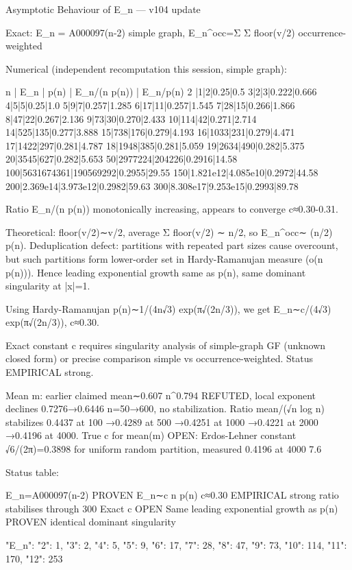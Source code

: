 Asymptotic Behaviour of E_n — v104 update

Exact: E_n = A000097(n-2) simple graph, E_n^{occ}=Σ Σ floor(v/2) occurrence-weighted

Numerical (independent recomputation this session, simple graph):

n | E_n | p(n) | E_n/(n p(n)) | E_n/p(n)
2 |1|2|0.25|0.5
3|2|3|0.222|0.666
4|5|5|0.25|1.0
5|9|7|0.257|1.285
6|17|11|0.257|1.545
7|28|15|0.266|1.866
8|47|22|0.267|2.136
9|73|30|0.270|2.433
10|114|42|0.271|2.714
14|525|135|0.277|3.888
15|738|176|0.279|4.193
16|1033|231|0.279|4.471
17|1422|297|0.281|4.787
18|1948|385|0.281|5.059
19|2634|490|0.282|5.375
20|3545|627|0.282|5.653
50|2977224|204226|0.2916|14.58
100|5631674361|190569292|0.2955|29.55
150|1.821e12|4.085e10|0.2972|44.58
200|2.369e14|3.973e12|0.2982|59.63
300|8.308e17|9.253e15|0.2993|89.78

Ratio E_n/(n p(n)) monotonically increasing, appears to converge c≈0.30-0.31.

Theoretical: floor(v/2)∼v/2, average Σ floor(v/2) ∼ n/2, so E_n^{occ}∼ (n/2) p(n). Deduplication defect: partitions with repeated part sizes cause overcount, but such partitions form lower-order set in Hardy-Ramanujan measure (o(n p(n))). Hence leading exponential growth same as p(n), same dominant singularity at |x|=1.

Using Hardy-Ramanujan p(n)∼1/(4n√3) exp(π√(2n/3)), we get E_n∼c/(4√3) exp(π√(2n/3)), c≈0.30.

Exact constant c requires singularity analysis of simple-graph GF (unknown closed form) or precise comparison simple vs occurrence-weighted. Status EMPIRICAL strong.

Mean m: earlier claimed mean∼0.607 n^{0.794} REFUTED, local exponent declines 0.7276→0.6446 n=50→600, no stabilization. Ratio mean/(√n log n) stabilizes 0.4437 at 100 →0.4289 at 500 →0.4251 at 1000 →0.4221 at 2000 →0.4196 at 4000. True c for mean(m) OPEN: Erdos-Lehner constant √6/(2π)=0.3898 for uniform random partition, measured 0.4196 at 4000 7.6%

Status table:

E_n=A000097(n-2) PROVEN
E_n∼c n p(n) c≈0.30 EMPIRICAL strong ratio stabilises through 300
Exact c OPEN
Same leading exponential growth as p(n) PROVEN identical dominant singularity

{
  "E_n": {
    "2": 1,
    "3": 2,
    "4": 5,
    "5": 9,
    "6": 17,
    "7": 28,
    "8": 47,
    "9": 73,
    "10": 114,
    "11": 170,
    "12": 253
  }
}

